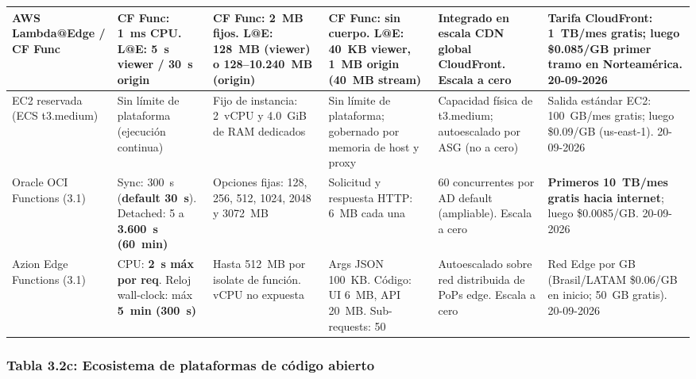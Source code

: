 \documentclass[12pt, letterpaper, table, xcdraw]{inf-pucv}
\begin{document}
\begin{landscape}
{\begin{longtable}{|p{2.6cm}|p{3.2cm}|p{3.4cm}|p{3.2cm}|p{3.6cm}|p{4.2cm}|}
AWS Lambda@Edge / CF Func & CF Func: \textbf{1~ms CPU}. L@E: 5~s viewer / 30~s origin & CF Func: 2~MB fijos. L@E: 128~MB (viewer) o 128--10.240~MB (origin) & CF Func: sin cuerpo. L@E: 40~KB viewer, 1~MB origin (40~MB stream) & Integrado en escala CDN global CloudFront. Escala a cero & Tarifa CloudFront: 1~TB/mes gratis; luego \$0.085/GB primer tramo en Norteamérica. 20-09-2026 \\ \hline

EC2 reservada (ECS t3.medium) & Sin límite de plataforma (ejecución continua) & Fijo de instancia: 2~vCPU y 4.0~GiB de RAM dedicados & Sin límite de plataforma; gobernado por memoria de host y proxy & Capacidad física de t3.medium; autoescalado por ASG (no a cero) & Salida estándar EC2: 100~GB/mes gratis; luego \$0.09/GB (us-east-1). 20-09-2026 \\ \hline

Oracle OCI Functions (3.1) & Sync: 300~s (\textbf{default 30~s}). Detached: 5 a \textbf{3.600~s (60~min)} & Opciones fijas: 128, 256, 512, 1024, 2048 y 3072~MB & Solicitud y respuesta HTTP: 6~MB cada una & 60 concurrentes por AD default (ampliable). Escala a cero & \textbf{Primeros 10~TB/mes gratis hacia internet}; luego \$0.0085/GB. 20-09-2026 \\ \hline

Azion Edge Functions (3.1) & CPU: \textbf{2~s máx por req}. Reloj wall-clock: máx \textbf{5~min (300~s)} & Hasta 512~MB por isolate de función. vCPU no expuesta & Args JSON 100~KB. Código: UI 6~MB, API 20~MB. Sub-requests: 50 & Autoescalado sobre red distribuida de PoPs edge. Escala a cero & Red Edge por GB (Brasil/LATAM \$0.06/GB en inicio; 50~GB gratis). 20-09-2026 \\ \hline
\end{longtable}
}
\end{landscape}

\subsubsection*{Tabla 3.2c: Ecosistema de plataformas de código abierto}
{\makeatletter\def\@currentlabel{3.2c}\makeatother\label{tab:cuadro-3-2c}}
\end{document}
